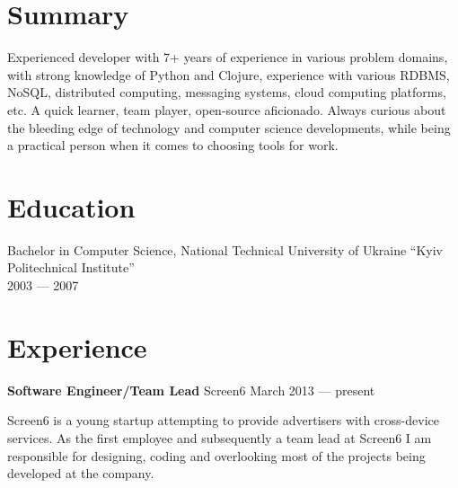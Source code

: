 \documentclass[margin]{res}
\begin{document}

\address{{\bf Address} \\ Czaar Peterstraat 103 \\ Amsterdam, The Netherlands}

\address{{\bf Contacts} \\ +31 62 980 61 41 \\ contact@mishkovskyi.net \\ \href{https://github.com/mishok13}{GitHub}}

\begin{resume}

\section{Summary}
Experienced developer with 7+ years of experience in various problem
domains, with strong knowledge of Python and Clojure, experience with
various RDBMS, NoSQL, distributed computing, messaging systems, cloud
computing platforms, etc. A quick learner, team player, open-source
aficionado. Always curious about the bleeding edge of technology and
computer science developments, while being a practical person when it
comes to choosing tools for work.

\section{Education}
Bachelor in Computer Science, National Technical University of Ukraine ``Kyiv Politechnical Institute'' \\
2003 --- 2007

\section{Experience}

{\bf Software Engineer/Team Lead} Screen6 \hfill March 2013 --- present

Screen6 is a young startup attempting to provide advertisers with
cross-device services. As the first employee and subsequently a team
lead at Screen6 I am responsible for designing, coding and overlooking
most of the projects being developed at the company.\\


\end{resume}
\end{document}
